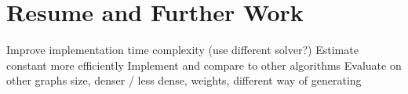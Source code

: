 \chapter{Resume and Further Work}\label{chapter:resmue_further_work}

Improve implementation time complexity (use different solver?)
Estimate constant more efficiently
Implement and compare to other algorithms
Evaluate on other graphs size, denser / less dense, weights, different way of generating

